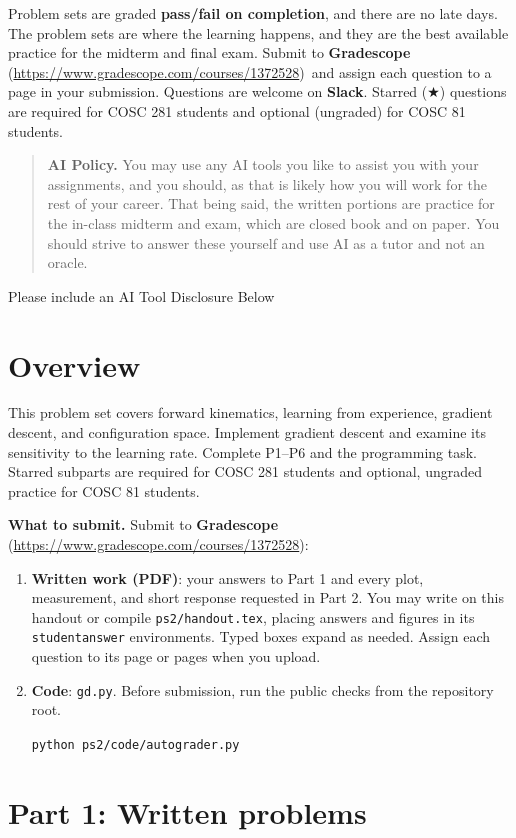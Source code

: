 \documentclass[11pt]{article}
\title{\textbf{\coursenumber:} #1}
\author{\textbf{Due} #2\\
  }
\date{}
\newcommand{\dgreen}[1]{\textcolor{DartmouthGreen}{#1}}
\newcommand{\dgbf}[1]{\textbf{\dgreen{#1}}}      %
\newcommand{\gradescopelink}{\textbf{Gradescope} (\url{https://www.gradescope.com/courses/1372528})}
\providecommand{\tightlist}{\setlength{\itemsep}{0pt}\setlength{\parskip}{0pt}}
\DeclareRobustCommand{\callout}[2][gray!10]{%
  \begin{tcolorbox}[left=8pt, arc=0pt, outer arc=0pt,
                    colframe=#1, colback=#1, coltext=black]#2\end{tcolorbox}}
\newcommand{\coursenotice}{%
  \callout{Problem sets are graded \textbf{pass/fail on completion}, and
  there are no late days. The problem sets are where the learning happens,
  and they are the best available practice for the midterm and final exam.
  Submit to \gradescopelink\ and assign each question to a page in your
  submission. Questions are welcome on \dgbf{Slack}. Starred ($\bigstar$)
  questions are required for COSC 281 students and optional (ungraded) for
  COSC 81 students.}}
\begin{document}
\maketitle

\coursenotice

\begin{quote}\small\textbf{AI Policy.} You may use any AI tools you like to assist you with your assignments, and you should, as that is likely how you will work for the rest of your career.
That being said, the written portions are practice for the in-class midterm and exam, which are closed book and on paper. You should strive to answer these yourself and use AI as a tutor and not an oracle.
\end{quote}

\callout{Please include an AI Tool Disclosure Below \vspace{50pt}}

\raggedbottom
\section*{Overview}

This problem set covers forward kinematics, learning from experience,
gradient descent, and configuration space. Implement gradient descent
and examine its sensitivity to the learning rate. Complete P1--P6 and
the programming task. Starred subparts are required for COSC 281 students
and optional, ungraded practice for COSC 81 students.

\textbf{What to submit.} Submit to \gradescopelink:\vspace{-10pt}
\begin{enumerate}\tightlist
\item \textbf{Written work (PDF)}: your answers to Part 1 and every plot,
      measurement, and short response requested in Part 2. You may write on
      this handout or compile \texttt{ps2/handout.tex}, placing answers and
      figures in its \texttt{studentanswer} environments. Typed boxes expand
      as needed. Assign each question to its page or pages when you upload.
\item \textbf{Code}: \texttt{gd.py}. Before submission, run the public
      checks from the repository root.
      \par\smallskip
      \texttt{python ps2/code/autograder.py}
\end{enumerate}

\clearpage
\section{Part 1: Written problems}
\end{document}

